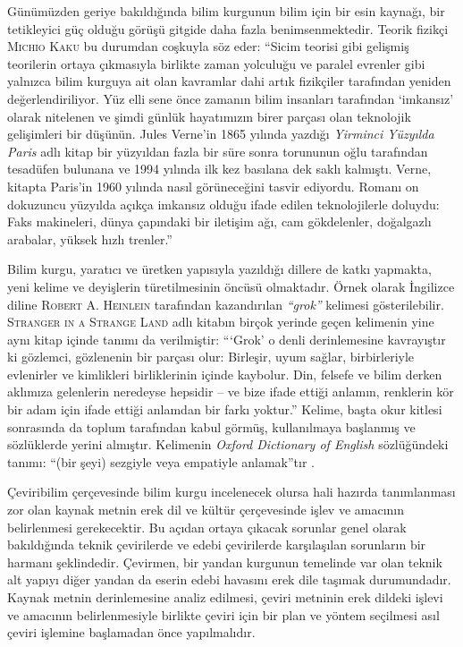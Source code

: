 Günümüzden geriye bakıldığında bilim kurgunun bilim için bir esin kaynağı, bir
tetikleyici güç olduğu görüşü gitgide daha fazla benimsenmektedir. Teorik
fizikçi \textsc{Michio Kaku} bu durumdan coşkuyla söz eder: ``Sicim teorisi
gibi gelişmiş teorilerin ortaya çıkmasıyla birlikte zaman yolculuğu ve paralel
evrenler gibi yalnızca bilim kurguya ait olan kavramlar dahi artık fizikçiler
tarafından yeniden değerlendiriliyor. Yüz elli sene önce zamanın bilim insanları
tarafından `imkansız' olarak nitelenen ve şimdi günlük hayatımızın birer
parçası olan teknolojik gelişimleri bir düşünün. Jules Verne'in 1865 yılında
yazdığı \emph{Yirminci Yüzyılda Paris} adlı kitap bir yüzyıldan fazla bir süre
sonra torununun oğlu tarafından tesadüfen bulunana ve 1994 yılında ilk kez
basılana dek saklı kalmıştı. Verne, kitapta Paris'in 1960 yılında nasıl
görüneceğini tasvir ediyordu. Romanı on dokuzuncu yüzyılda açıkça imkansız
olduğu ifade edilen teknolojilerle doluydu: Faks makineleri, dünya çapındaki bir
iletişim ağı, cam gökdelenler, doğalgazlı arabalar, yüksek hızlı trenler.''
\citep{PhyIMP09}

Bilim kurgu, yaratıcı ve üretken yapısıyla yazıldığı dillere de katkı yapmakta,
yeni kelime ve deyişlerin türetilmesinin öncüsü olmaktadır. Örnek olarak
İngilizce diline \textsc{Robert A. Heinlein} tarafından kazandırılan
\emph{``grok''} kelimesi gösterilebilir. \textsc{Stranger in a Strange Land}
adlı kitabın birçok yerinde geçen kelimenin yine aynı kitap içinde tanımı da
verilmiştir: ```Grok' o denli derinlemesine kavrayıştır ki gözlemci, gözlenenin
bir parçası olur: Birleşir, uyum sağlar, birbirleriyle evlenirler ve kimlikleri
birliklerinin içinde kaybolur. Din, felsefe ve bilim derken aklımıza gelenlerin
neredeyse hepsidir -- ve bize ifade ettiği anlamın, renklerin kör bir adam için
ifade ettiği anlamdan bir farkı yoktur.'' \citep{SSL61} Kelime, başta okur
kitlesi sonrasında da toplum tarafından kabul görmüş, kullanılmaya başlanmış ve
sözlüklerde yerini almıştır. Kelimenin \emph{Oxford Dictionary of English}
sözlüğündeki tanımı: ``(bir şeyi) sezgiyle veya empatiyle anlamak''tır
\citep{Oxford05}.

Çeviribilim çerçevesinde bilim kurgu incelenecek olursa hali hazırda
tanımlanması zor olan kaynak metnin erek dil ve kültür çerçevesinde işlev ve
amacının belirlenmesi gerekecektir. Bu açıdan ortaya çıkacak sorunlar genel
olarak bakıldığında teknik çevirilerde \citep{Aksoy1998} ve edebi çevirilerde
karşılaşılan sorunların \citep{BengiÖner1999} bir harmanı şeklindedir. Çevirmen,
bir yandan kurgunun temelinde var olan teknik alt yapıyı diğer yandan da eserin
edebi havasını erek dile taşımak durumundadır. Kaynak metnin derinlemesine
analiz edilmesi, çeviri metninin erek dildeki işlevi ve amacının belirlenmesiyle
birlikte çeviri için bir plan ve yöntem seçilmesi asıl çeviri işlemine
başlamadan önce yapılmalıdır.

